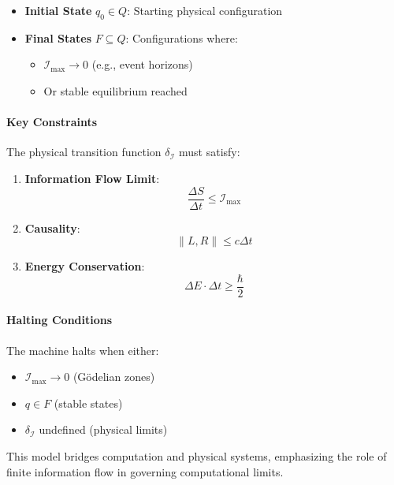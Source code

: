 \documentclass[12pt]{article}
\begin{document}
\begin{itemize}
    \item \textbf{Initial State} \(q_0 \in Q\): Starting physical configuration

    \item \textbf{Final States} \(F \subseteq Q\): Configurations where:
    \begin{itemize}
        \item \(\mathcal{I}_{\text{max}} \to 0\) (e.g., event horizons)
        \item Or stable equilibrium reached
    \end{itemize}
\end{itemize}

\paragraph{Key Constraints}
The physical transition function \(\delta_{\mathcal{I}}\) must satisfy:
\begin{enumerate}
    \item \textbf{Information Flow Limit}:
    \[
    \frac{\Delta S}{\Delta t} \leq \mathcal{I}_{\text{max}}
    \]

    \item \textbf{Causality}:
    \[
    \|L,R\| \leq c\Delta t
    \]

    \item \textbf{Energy Conservation}:
    \[
    \Delta E \cdot \Delta t \geq \frac{\hbar}{2}
    \]
\end{enumerate}

\paragraph{Halting Conditions}
The machine halts when either:
\begin{itemize}
    \item \(\mathcal{I}_{\text{max}} \to 0\) (Gödelian zones)
    \item \(q \in F\) (stable states)
    \item \(\delta_{\mathcal{I}}\) undefined (physical limits)
\end{itemize}

This model bridges computation and physical systems, emphasizing the role of finite information flow in governing computational limits.
\end{document}
